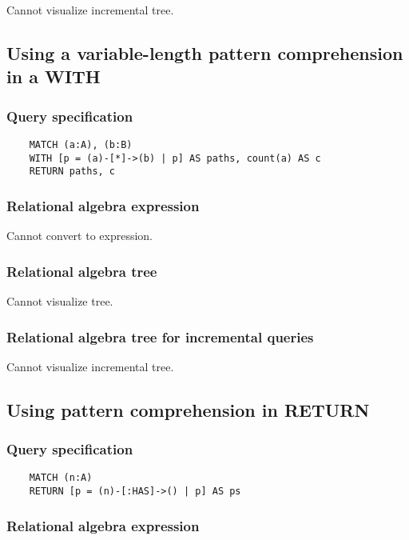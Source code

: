 	Cannot visualize incremental tree.
	\subsection{Using a variable-length pattern comprehension in a WITH}

	\subsubsection*{Query specification}

	\begin{lstlisting}
	MATCH (a:A), (b:B)
	WITH [p = (a)-[*]->(b) | p] AS paths, count(a) AS c
	RETURN paths, c
	\end{lstlisting}


	\subsubsection*{Relational algebra expression}

	Cannot convert to expression.

	\subsubsection*{Relational algebra tree}

	Cannot visualize tree.

	\subsubsection*{Relational algebra tree for incremental queries}

	Cannot visualize incremental tree.
	\subsection{Using pattern comprehension in RETURN}

	\subsubsection*{Query specification}

	\begin{lstlisting}
	MATCH (n:A)
	RETURN [p = (n)-[:HAS]->() | p] AS ps
	\end{lstlisting}


	\subsubsection*{Relational algebra expression}

